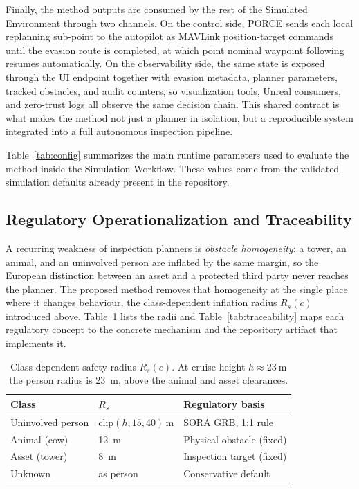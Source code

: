 \documentclass[journal,twoside,web]{ieeecolor}
\begin{document}
Finally, the method outputs are consumed by the rest of the Simulated Environment through two channels. On the control side, PORCE sends each local replanning sub-point to the autopilot as MAVLink position-target commands until the evasion route is completed, at which point nominal waypoint following resumes automatically. On the observability side, the same state is exposed through the UI endpoint together with evasion metadata, planner parameters, tracked obstacles, and audit counters, so visualization tools, Unreal consumers, and zero-trust logs all observe the same decision chain. This shared contract is what makes the method not just a planner in isolation, but a reproducible system integrated into a full autonomous inspection pipeline.


Table~\ref{tab:config} summarizes the main runtime parameters used to evaluate the method inside the Simulation Workflow. These values come from the validated simulation defaults already present in the repository.

\subsection{Regulatory Operationalization and Traceability}
\label{subsec:reg}
A recurring weakness of inspection planners is \emph{obstacle homogeneity}: a tower, an animal, and an uninvolved person are inflated by the same margin, so the European distinction between an asset and a protected third party never reaches the planner. The proposed method removes that homogeneity at the single place where it changes behaviour, the class-dependent inflation radius $R_s(c)$ introduced above. Table~\ref{tab:classradius} lists the radii and Table~\ref{tab:traceability} maps each regulatory concept to the concrete mechanism and the repository artifact that implements it.

\begin{table}[t]
    \centering
    \small
    \begin{tabular}{@{}lll@{}}
        \toprule
        \textbf{Class} & \textbf{$R_s$} & \textbf{Regulatory basis} \\
        \midrule
        Uninvolved person & $\mathrm{clip}(h,15,40)\,$m & SORA GRB, 1:1 rule \\
        Animal (cow) & \SI{12}{\meter} & Physical obstacle (fixed) \\
        Asset (tower) & \SI{8}{\meter} & Inspection target (fixed) \\
        Unknown & as person & Conservative default \\
        \bottomrule
    \end{tabular}
    \caption{Class-dependent safety radius $R_s(c)$. At cruise height $h\approx\SI{23}{\meter}$ the person radius is \SI{23}{\meter}, above the animal and asset clearances.}
    \label{tab:classradius}
\end{table}
\end{document}
